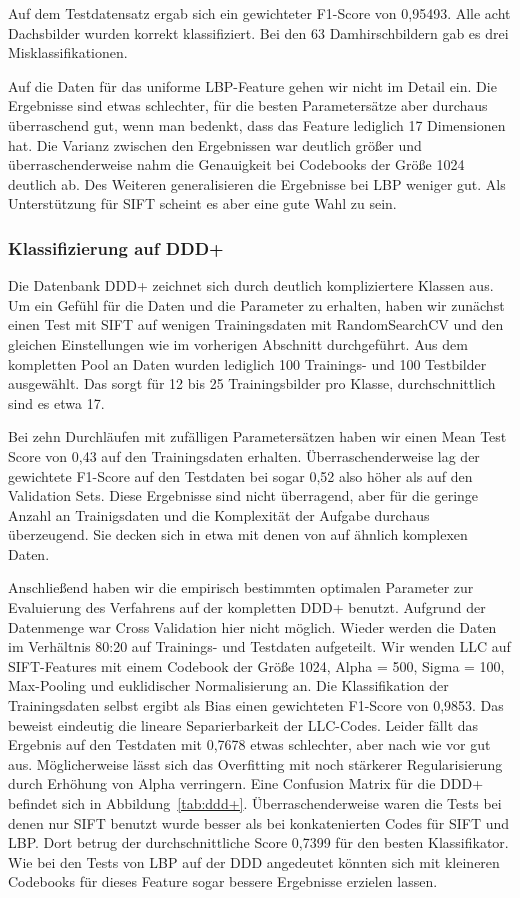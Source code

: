 Auf dem Testdatensatz ergab sich ein gewichteter F1-Score von 0,95493. Alle acht Dachsbilder wurden korrekt klassifiziert. Bei den 63 Damhirschbildern gab es drei Misklassifikationen. 

Auf die Daten für das uniforme LBP-Feature gehen wir nicht im Detail ein. Die Ergebnisse sind etwas schlechter, für die besten Parametersätze aber durchaus überraschend gut, wenn man bedenkt, dass das Feature lediglich 17 Dimensionen hat. Die Varianz zwischen den Ergebnissen war deutlich größer und überraschenderweise nahm die Genauigkeit bei Codebooks der Größe 1024 deutlich ab. Des Weiteren generalisieren die Ergebnisse bei LBP weniger gut. Als Unterstützung für SIFT scheint es aber eine gute Wahl zu sein.

\subsubsection{Klassifizierung auf DDD+}

Die Datenbank DDD+ zeichnet sich durch deutlich kompliziertere Klassen aus. Um ein Gefühl für die Daten und die Parameter zu erhalten, haben wir zunächst einen Test mit SIFT auf wenigen Trainingsdaten mit RandomSearchCV und den gleichen Einstellungen wie im vorherigen Abschnitt durchgeführt. Aus dem kompletten Pool an Daten wurden lediglich 100 Trainings- und 100 Testbilder ausgewählt. Das sorgt für 12 bis 25 Trainingsbilder pro Klasse, durchschnittlich sind es etwa 17.

Bei zehn Durchläufen mit zufälligen Parametersätzen haben wir einen Mean Test Score von 0,43 auf den Trainingsdaten erhalten. Überraschenderweise lag der gewichtete F1-Score auf den Testdaten bei sogar 0,52 also höher als auf den Validation Sets. Diese Ergebnisse sind nicht überragend, aber für die geringe Anzahl an Trainigsdaten und die Komplexität der Aufgabe durchaus überzeugend. Sie decken sich in etwa mit denen von \cite{wyylhg10} auf ähnlich komplexen Daten.

Anschließend haben wir die empirisch bestimmten optimalen Parameter zur Evaluierung des Verfahrens auf der kompletten DDD+ benutzt. Aufgrund der Datenmenge war Cross Validation hier nicht möglich. Wieder werden die Daten im Verhältnis 80:20 auf Trainings- und Testdaten aufgeteilt. Wir wenden LLC auf SIFT-Features mit einem Codebook der Größe 1024, Alpha = 500, Sigma = 100, Max-Pooling und euklidischer Normalisierung an. Die Klassifikation der Trainingsdaten selbst ergibt als Bias einen gewichteten F1-Score von 0,9853. Das beweist eindeutig die lineare Separierbarkeit der LLC-Codes. Leider fällt das Ergebnis auf den Testdaten mit 0,7678 etwas schlechter, aber nach wie vor gut aus. Möglicherweise lässt sich das Overfitting mit noch stärkerer Regularisierung durch Erhöhung von Alpha verringern. Eine Confusion Matrix für die DDD+ befindet sich in Abbildung~\ref{tab:ddd+}. Überraschenderweise waren die Tests bei denen nur SIFT benutzt wurde besser als bei konkatenierten Codes für SIFT und LBP. Dort betrug der durchschnittliche Score 0,7399 für den besten Klassifikator. Wie bei den Tests von LBP auf der DDD angedeutet könnten sich mit kleineren Codebooks für dieses Feature sogar bessere Ergebnisse erzielen lassen.

